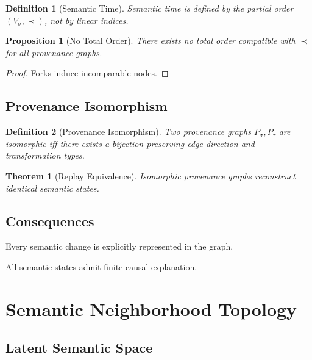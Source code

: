 \documentclass[11pt]{article}
\newtheorem{definition}{Definition}
\newtheorem{proposition}{Proposition}
\newtheorem{theorem}{Theorem}
\begin{document}
\begin{definition}[Semantic Time]
Semantic time is defined by the partial order $(V_\sigma, \prec)$, not by linear indices.
\end{definition}

\begin{proposition}[No Total Order]
There exists no total order compatible with $\prec$ for all provenance graphs.
\end{proposition}

\begin{proof}
Forks induce incomparable nodes.
\end{proof}

\subsection{Provenance Isomorphism}

\begin{definition}[Provenance Isomorphism]
Two provenance graphs $P_\sigma, P_\tau$ are isomorphic iff there exists a bijection
preserving edge direction and transformation types.
\end{definition}

\begin{theorem}[Replay Equivalence]
Isomorphic provenance graphs reconstruct identical semantic states.
\end{theorem}

\subsection{Consequences}

\begin{corollary}
Every semantic change is explicitly represented in the graph.
\end{corollary}

\begin{corollary}
All semantic states admit finite causal explanation.
\end{corollary}

\section{Semantic Neighborhood Topology}

\subsection{Latent Semantic Space}
\end{document}
